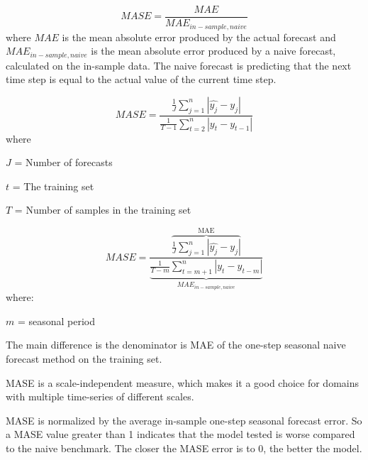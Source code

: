 \begin{displaymath}
  MASE = \frac{MAE}{MAE_{in-sample, naive}}
\end{displaymath}
where $MAE$ is the mean absolute error
produced by the actual forecast and
$MAE_{in-sample, naive} $
is the mean absolute error produced by
a naive forecast, calculated on the in-sample data.
The naive forecast is predicting that the next
time step is equal to the actual value of the current time step.


\begin{displaymath}
  \label{eq:MASE}
  MASE = \frac{\frac{1}{J} \sum_{j=1}^n |\hat{y_j} - y_j|}{\frac{1}{T-1} \sum_{t=2}^n |y_t - y_{t-1}|}
\end{displaymath}
where

$J$ = Number of forecasts

$t$ = The training set

$T$ = Number of samples in the training set

\begin{equation}
  \label{eq:MASE-Seasonal}
  MASE = \frac{
    \overbrace{
      \frac{1}{J} \sum_{j=1}^n |\hat{y_j} - y_j|}^\text{MAE}}{
    \underbrace{
      \frac{1}{T-m} \sum_{t=m+1}^n |y_t - y_{t-m}|}_\text{$MAE_{in-sample, naive}$}
  }
\end{equation}
where:

$m$ = seasonal period

The main difference is the denominator is MAE
of the one-step seasonal naive forecast method on the training set.

MASE is a scale-independent measure, which makes it
a good choice for domains with multiple time-series of
different scales.

MASE is normalized by the average in-sample one-step
seasonal forecast error. So a MASE value greater than
1 indicates that the model tested is worse compared
to the naive benchmark.
The closer the MASE error is to 0, the better the model.



\iffalse
  \subsubsection{RMSE}
  \todo[inline]{TODO}

  \subsubsection{$R^2$}
  \todo[inline]{TODO}
\fi

